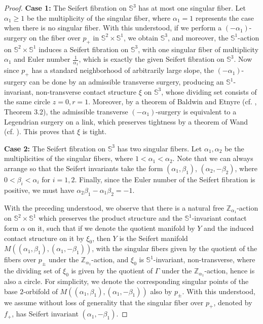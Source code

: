 \documentclass[11pt]{amsart}
\theoremstyle{plain}
\numberwithin{theorem}{section}
\theoremstyle{definition}
\newcommand{\Z}{{\mathbb Z}}
\newcommand{\s}{{\mathbb S}}
\begin{document}
\begin{proof}
{\bf Case 1:} The Seifert fibration on $\s^3$ has at most one singular fiber. Let $\alpha_1\geq 1$ be the multiplicity of the singular fiber, where $\alpha_1=1$ represents the case when there is no singular fiber. With this understood, if we perform a $(-\alpha_1)$-surgery on the fiber over $p_{+}$ in
$\s^2\times\s^1$, we obtain $\s^3$, and moreover, the $\s^1$-action on $\s^2\times \s^1$ induces a
Seifert fibration on $\s^3$, with one singular fiber of multiplicity $\alpha_1$ and Euler number
$\frac{1}{\alpha_1}$, which is exactly the given Seifert fibration on $\s^3$. Now since $p_{+}$ has a standard neighborhood of arbitrarily large slope, the $(-\alpha_1)$-surgery can be done by an admissible transverse surgery, producing an $\s^1$-invariant, non-transverse contact structure $\xi$ on $\s^3$, whose dividing set consists of the same circle $z=0,r=1$. Moreover, by a theorem of Baldwin and Etnyre (cf. \cite{BE}, Theorem 3.2), the admissible transverse $(-\alpha_1)$-surgery is equivalent to a Legendrian surgery on a link, which preserves tightness by a theorem of Wand (cf. \cite{Wa}). This proves that $\xi$ is tight. 

\vspace{1.5mm}

{\bf Case 2:} The Seifert fibration on $\s^3$ has two singular fibers. Let $\alpha_1,\alpha_2$ be the
multiplicities of the singular fibers, where $1<\alpha_1<\alpha_2$. Note that we can always arrange
so that the Seifert invariants take the form $(\alpha_1,\beta_1)$, $(\alpha_2,-\beta_2)$, where
$0<\beta_i<\alpha_i$ for $i=1,2$. Finally, since the Euler number of the Seifert fibration is positive,
we must have $\alpha_2\beta_1-\alpha_1\beta_2=-1$.

With the preceding understood, we observe that there is a natural free $\Z_{\alpha_1}$-action on
$\s^2\times\s^1$ which preserves the product structure and the $\s^1$-invariant contact form $\alpha$ on it, such that if we denote the quotient manifold by $Y$ and the induced contact structure on it 
by $\xi_0$, then $Y$ is the Seifert manifold $M((\alpha_1,\beta_1), (\alpha_1,-\beta_1))$, with the singular fibers given by the quotient of the fibers over $p_{\pm}$ under the $\Z_{\alpha_1}$-action, and $\xi_0$ is $\s^1$-invariant, non-transverse, where the dividing set of $\xi_0$ is given by the quotient of 
$\Gamma$ under the $\Z_{\alpha_1}$-action, hence is also a circle. For simplicity, we denote the corresponding singular points of the base $2$-orbifold of $M((\alpha_1,\beta_1), (\alpha_1,-\beta_1))$ also by $p_{\pm}$. With this understood, we assume without loss of generality that the singular fiber over $p_{+}$, denoted by $f_{+}$, has Seifert invariant $(\alpha_1,-\beta_1)$. 


\end{proof}
\end{document}

